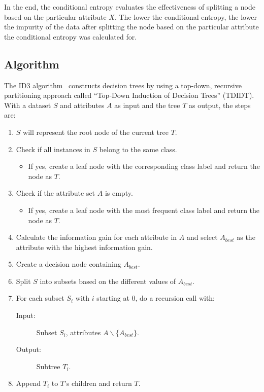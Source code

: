 In the end, the conditional entropy evaluates the effectiveness of splitting a node based on the particular attribute $X$. The lower the conditional entropy, the lower the impurity of the data after splitting the node based on the particular attribute the conditional entropy was calculated for.
\pagebreak

\subsection{Algorithm}
The ID3 algorithm~\cite{id3_algorithm_wiki} constructs decision trees by using a top-down, recursive partitioning approach called ``Top-Down Induction of Decision Trees'' (TDIDT). With a dataset $S$ and attributes $A$ as input and the tree $T$ as output, the steps are:

\begin{enumerate}
	\item $S$ will represent the root node of the current tree $T$.
	\item Check if all instances in $S$ belong to the same class.
    \begin{itemize}
        \item If yes, create a leaf node with the corresponding class label and return the node as $T$.
    \end{itemize}
    \item Check if the attribute set $A$ is empty.
    \begin{itemize}
        \item If yes, create a leaf node with the most frequent class label and return the node as $T$.
    \end{itemize}
    \item Calculate the information gain for each attribute in $A$ and select $A_{best}$ as the attribute with the highest information gain.
    \item Create a decision node containing $A_{best}$.
    \item Split $S$ into subsets based on the different values of $A_{best}$.
    \item For each subset $S_i$ with $i$ starting at 0, do a recursion call with:
    \begin{description}
    	\item[Input:] Subset $S_i$, attributes $A \backslash \{A_{best}\}$.
    	\item[Output:] Subtree $T_i$.
    \end{description}
    \item Append $T_i$ to $T$'s children and return $T$. 
\end{enumerate}
